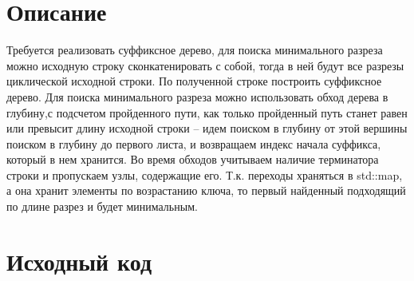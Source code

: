 \section{Описание}
Требуется реализовать суффиксное дерево, для поиска минимального разреза можно исходную строку сконкатенировать с собой, тогда в ней будут все разрезы циклической исходной строки. По полученной строке построить суффиксное дерево. Для поиска минимального разреза можно использовать обход дерева в глубину,с подсчетом пройденного пути, как только пройденный путь станет равен или превысит длину исходной строки -- идем поиском в глубину от этой вершины поиском в глубину до первого листа, и возвращаем индекс начала суффикса, который в нем хранится. Во время обходов учитываем наличие терминатора строки и пропускаем узлы, содержащие его. Т.к. переходы храняться в std::map, а она хранит элементы по возрастанию ключа, то первый найденный подходящий по длине разрез и будет минимальным.

\pagebreak

\section{Исходный код}

